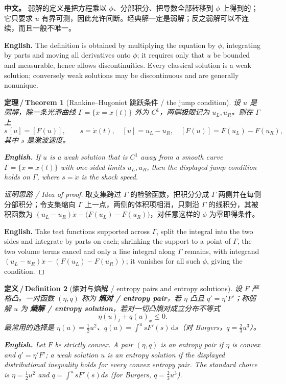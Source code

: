 \documentclass[UTF8,11pt,a4paper]{ctexart}
\newcommand{\APS}[2]{\par\noindent\textbf{中文。} #1\par\noindent\textbf{English.} #2\par\smallskip}
\newcommand{\EN}[1]{\par\noindent \textbf{English.} #1\par}
\newtheorem{definition}{定义\,/\,Definition}[section]
\newtheorem{theorem}[definition]{定理\,/\,Theorem}
\newcommand{\dd}{\mathrm{d}}
\begin{document}
\APS{弱解的定义是把方程乘以 $\phi$、分部积分、把导数全部转移到 $\phi$ 上得到的；它只要求 $u$ 有界可测，因此允许间断。经典解一定是弱解；反之弱解可以不连续，而且一般不唯一。}{The definition is obtained by multiplying the equation by $\phi$, integrating by parts and moving all derivatives onto $\phi$; it requires only that $u$ be bounded and measurable, hence allows discontinuities. Every classical solution is a weak solution; conversely weak solutions may be discontinuous and are generally nonunique.}

\begin{theorem}[Rankine--Hugoniot 跳跃条件 / the jump condition]\label{thm:rh}
设 $u$ 是弱解，除一条光滑曲线 $\Gamma=\{x=x(t)\}$ 外为 $C^1$，两侧极限记为 $u_L,u_R$。则在 $\Gamma$ 上
\[
s\,[u]=[F(u)],\qquad s=\dot x(t),\quad [u]=u_L-u_R,\quad [F(u)]=F(u_L)-F(u_R),
\]
其中 $s$ 是激波速度。
\EN{If $u$ is a weak solution that is $C^1$ away from a smooth curve $\Gamma=\{x=x(t)\}$ with one-sided limits $u_L,u_R$, then the displayed jump condition holds on $\Gamma$, where $s=\dot x$ is the shock speed.}
\end{theorem}

\begin{proof}[证明思路 / Idea of proof]
取支集跨过 $\Gamma$ 的检验函数，把积分分成 $\Gamma$ 两侧并在每侧分部积分；令支集缩向 $\Gamma$ 上一点，两侧的体积项相消，只剩沿 $\Gamma$ 的线积分，其被积函数为 $(u_L-u_R)\dot x-\bigl(F(u_L)-F(u_R)\bigr)$，对任意这样的 $\phi$ 为零即得条件。\EN{Take test functions supported across $\Gamma$, split the integral into the two sides and integrate by parts on each; shrinking the support to a point of $\Gamma$, the two volume terms cancel and only a line integral along $\Gamma$ remains, with integrand $(u_L-u_R)\dot x-(F(u_L)-F(u_R))$; it vanishes for all such $\phi$, giving the condition.}
\end{proof}

\begin{definition}[熵对与熵解 / entropy pairs and entropy solutions]\label{def:entropy}
设 $F$ 严格凸。一对函数 $(\eta,q)$ 称为 \textbf{熵对 / entropy pair}，若 $\eta$ 凸且 $q'=\eta'F'$；称弱解 $u$ 为 \textbf{熵解 / entropy solution}，若对一切凸熵对成立分布不等式
\[
\eta(u)_t+q(u)_x\le0 .
\]
最常用的选择是 $\eta(u)=\frac12u^2$、$q(u)=\int^u sF'(s)\,\dd s$（对 Burgers，$q=\frac23u^3$）。
\EN{Let $F$ be strictly convex. A pair $(\eta,q)$ is an entropy pair if $\eta$ is convex and $q'=\eta'F'$; a weak solution $u$ is an entropy solution if the displayed distributional inequality holds for every convex entropy pair. The standard choice is $\eta=\frac12u^2$ and $q=\int^u sF'(s)ds$ (for Burgers, $q=\frac23u^3$).}
\end{definition}
\end{document}
